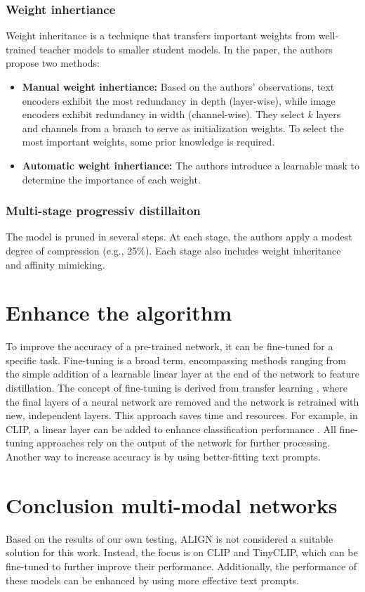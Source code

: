         \subsubsection{Weight inhertiance
        \label{section:weightinheritance}}
        Weight inheritance is a technique that transfers important weights from well-trained teacher models to smaller student models. 
        In the paper, the authors propose two methods:
        \begin{itemize}
            \item \textbf{Manual weight inhertiance:} Based on the authors' observations, text encoders exhibit the most redundancy in depth (layer-wise), while image encoders exhibit redundancy in width (channel-wise). 
            They select \(k\) layers and channels from a branch to serve as initialization weights. 
            To select the most important weights, some prior knowledge is required.
            \item \textbf{Automatic weight inhertiance:} The authors introduce a learnable mask to determine the importance of each weight.
        \end{itemize}

        \subsubsection{Multi-stage progressiv distillaiton}
        The model is pruned in several steps. 
        At each stage, the authors apply a modest degree of compression (e.g., 25\%). Each stage also includes weight inheritance and affinity mimicking.
        

\section{Enhance the algorithm
    \label{section:enhancealgorithm}}

    To improve the accuracy of a pre-trained network, it can be fine-tuned for a specific task. 
    Fine-tuning is a broad term, encompassing methods ranging from the simple addition of a learnable linear layer at the end of the network to feature distillation. 
    The concept of fine-tuning is derived from transfer learning \cite{transferlearning}, where the final layers of a neural network are removed and the network is retrained with new, independent layers. 
    This approach saves time and resources. 
    For example, in CLIP, a linear layer can be added to enhance classification performance \cite{finetuneclip}. 
    All fine-tuning approaches rely on the output of the network for further processing. 
    Another way to increase accuracy is by using better-fitting text prompts.
    
\section{Conclusion multi-modal networks}
    Based on the results of our own testing, ALIGN is not considered a suitable solution for this work. 
    Instead, the focus is on CLIP and TinyCLIP, which can be fine-tuned to further improve their performance. 
    Additionally, the performance of these models can be enhanced by using more effective text prompts.